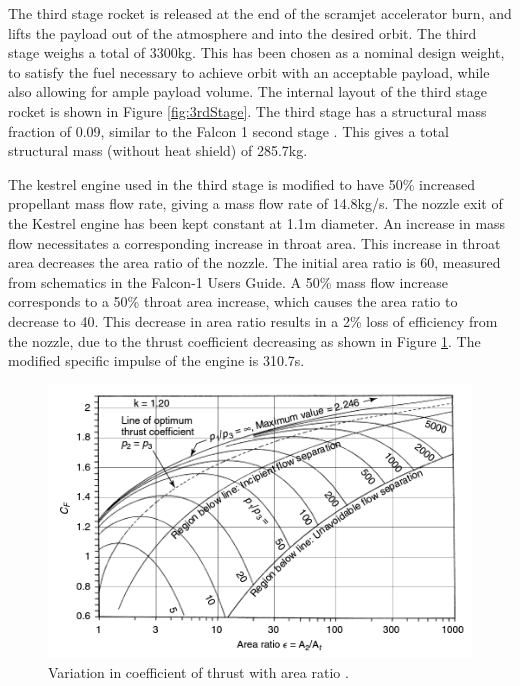 	The third stage rocket is released at the end of the scramjet accelerator burn, and lifts the payload out of the atmosphere and into the desired orbit. The third stage weighs a total of 3300kg. This has been chosen as a nominal design weight, to satisfy the fuel necessary to achieve orbit with an acceptable payload, while also allowing for ample payload volume. The internal layout of the third stage rocket is shown in Figure \ref{fig:3rdStage}. The third stage has a structural mass fraction of 0.09, similar to the Falcon 1 second stage \cite{Vehicle2008}. This gives a total structural mass (without heat shield) of 285.7kg. 
	
	

	
The kestrel engine used in the third stage is modified to have 50\% increased propellant mass flow rate, giving a mass flow rate of 14.8kg/s. The nozzle exit of the Kestrel engine has been kept constant at 1.1m diameter. An increase in mass flow necessitates a corresponding increase in throat area. This increase in throat area decreases the area ratio of the nozzle. The initial area ratio is 60, measured from schematics in the Falcon-1 Users Guide. A 50\% mass flow increase corresponds to a 50\% throat area increase, which causes the area ratio to decrease to 40. This decrease in area ratio results in a 2\% loss of efficiency from the nozzle\cite{RPE}, due to the thrust coefficient decreasing as shown in Figure \ref{fig:ThrustCoefficient-Arat}. The modified specific impulse of the engine is 310.7s.



	
	
	\begin{figure}
\centering
\includegraphics[width=0.7\linewidth]{"figures/3_vehicle_design/Thrust Coefficient - Arat"}
\caption{Variation in coefficient of thrust with area ratio \cite{RPE}.}
\label{fig:ThrustCoefficient-Arat}
\end{figure}



